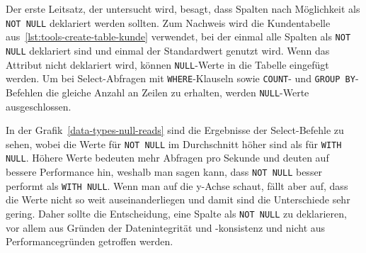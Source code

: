 Der erste Leitsatz, der untersucht wird, besagt, dass Spalten nach Möglichkeit als \texttt{NOT NULL} deklariert werden sollten.
Zum Nachweis wird die Kundentabelle aus~\ref{lst:tools-create-table-kunde} verwendet, bei der einmal alle Spalten als \texttt{NOT NULL} deklariert sind und einmal der Standardwert genutzt wird.
Wenn das Attribut nicht deklariert wird, können \texttt{NULL}-Werte in die Tabelle eingefügt werden.
Um bei Select-Abfragen mit \texttt{WHERE}-Klauseln sowie \texttt{COUNT}- und \texttt{GROUP BY}-Befehlen die gleiche Anzahl an Zeilen zu erhalten, werden \texttt{NULL}-Werte ausgeschlossen.

In der Grafik~\ref{data-types-null-reads} sind die Ergebnisse der Select-Befehle zu sehen, wobei die Werte für \texttt{NOT NULL} im Durchschnitt höher sind als für \texttt{WITH NULL}.
Höhere Werte bedeuten mehr Abfragen pro Sekunde und deuten auf bessere Performance hin, weshalb man sagen kann, dass \texttt{NOT NULL} besser performt als \texttt{WITH NULL}.
Wenn man auf die y-Achse schaut, fällt aber auf, dass die Werte nicht so weit auseinanderliegen und damit sind die Unterschiede sehr gering.
Daher sollte die Entscheidung, eine Spalte als \texttt{NOT NULL} zu deklarieren, vor allem aus Gründen der Datenintegrität und -konsistenz und nicht aus Performancegründen getroffen werden.

